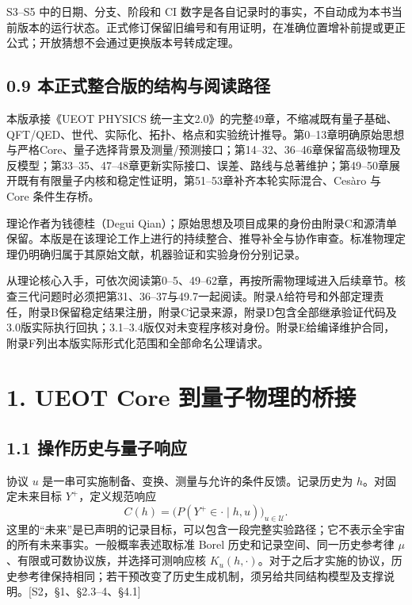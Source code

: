 \documentclass[
  11pt,
  oneside]{book}
\begin{document}
S3--S5 中的日期、分支、阶段和 CI
数字是各自记录时的事实，不自动成为本书当前版本的运行状态。正式修订保留旧编号和有用证明，在准确位置增补前提或更正公式；开放猜想不会通过更换版本号转成定理。

\hypertarget{ux672cux6b63ux5f0fux6574ux5408ux7248ux7684ux7ed3ux6784ux4e0eux9605ux8bfbux8defux5f84}{%
\section{0.9
本正式整合版的结构与阅读路径}\label{ux672cux6b63ux5f0fux6574ux5408ux7248ux7684ux7ed3ux6784ux4e0eux9605ux8bfbux8defux5f84}}

本版承接《UEOT PHYSICS
统一主文2.0》的完整49章，不缩减既有量子基础、QFT/QED、世代、实际化、拓扑、格点和实验统计推导。第0--13章明确原始思想与严格Core、量子选择背景及测量/预测接口；第14--32、36--46章保留高级物理及反模型；第33--35、47--48章更新实际接口、误差、路线与总著维护；第49--50章展开既有有限量子内核和稳定性证明，第51--53章补齐本轮实际混合、Cesàro
与 Core 条件生存桥。

理论作者为钱德桂（Degui
Qian）；原始思想及项目成果的身份由附录C和源清单保留。本版是在该理论工作上进行的持续整合、推导补全与协作审查。标准物理定理仍明确归属于其原始文献，机器验证和实验身份分别记录。

从理论核心入手，可依次阅读第0--5、49--62章，再按所需物理域进入后续章节。核查三代问题时必须把第31、36--37与49.7一起阅读。附录A给符号和外部定理责任，附录B保留稳定结果注册，附录C记录来源，附录D包含全部继承验证代码及3.0版实际执行回执；3.1--3.4版仅对未变程序核对身份。附录E给编译维护合同，附录F列出本版实际形式化范围和全部命名公理请求。

\hypertarget{ch-1}{%
\chapter{1. UEOT Core 到量子物理的桥接}\label{ch-1}}

\hypertarget{ux64cdux4f5cux5386ux53f2ux4e0eux91cfux5b50ux54cdux5e94}{%
\section{1.1
操作历史与量子响应}\label{ux64cdux4f5cux5386ux53f2ux4e0eux91cfux5b50ux54cdux5e94}}

协议 \(u\) 是一串可实施制备、变换、测量与允许的条件反馈。记录历史为
\(h\)。对固定未来目标 \(Y^+\)，定义规范响应 \[
C(h)=\bigl(P(Y^+\in\cdot\mid h,u)\bigr)_{u\in\mathcal U}.
\]
这里的``未来''是已声明的记录目标，可以包含一段完整实验路径；它不表示全宇宙的所有未来事实。一般概率表述取标准
Borel 历史和记录空间、同一历史参考律
\(\mu\)、有限或可数协议族，并选择可测响应核
\(K_u(h,\cdot)\)。对于之后才实施的协议，历史参考律保持相同；若干预改变了历史生成机制，须另给共同结构模型及支撑说明。{[}S2，§1、§2.3--4、§4.1{]}
\end{document}
